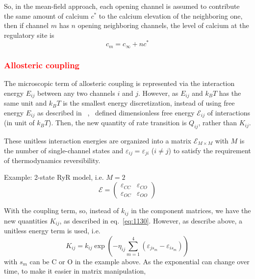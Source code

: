 So, in the mean-field approach, each opening channel is assumed to contribute
the same amount of calcium $c^*$ to the calcium elevation of the neighboring
one, then if channel $m$ has $n$ opening neighboring channels, the level of calcium at the regulatory
site is
\begin{equation}
  \label{eq:1154}
  c_m = c_\infty + nc^*
\end{equation}

\subsubsection{\textcolor{red}{\bf Allosteric coupling}}

The microscopic term of allosteric coupling is represented via the interaction
energy $E_{ij}$ between any two channels $i$ and $j$. However, as $E_{ij}$ and $k_BT$ has the same unit
and $k_BT$ is the smallest energy discretization, instead of using free energy $E_{ij}$ as
described in ~\citep{stern1999lcm},~\citep{groff2008} defined
dimensionless free energy $\mathcal{E}_{ij}$ of interactions (in unit
of $k_BT$). Then, the new quantity of rate transition is $Q_{ij}$,
rather than $K_{ij}$.

These unitless interaction energies are organized into a matrix
$\mathcal{E}_{M\times M}$ with $M$ is the number of single-channel
states and $\varepsilon_{ij}=\varepsilon_{ji}$ ($i\ne j$) to satisfy
the requirement of thermodynamics reversibility.

Example: 2-state RyR model, i.e. $M=2$
\begin{equation}
  \label{eq:1135}
  \mathcal{E}=\left(
    \begin{array}{ll}
      \varepsilon_{CC} & \varepsilon_{CO}\\
      \varepsilon_{OC} & \varepsilon_{OO}
    \end{array}
\right)
\end{equation}

With the coupling term, so, instead of $k_{ij}$ in the component matrices, we
have the new quantities $K_{ij}$, as described in eq.~\eqref{eq:1130}. However,
as describe above, a unitless energy term is used, i.e.
\begin{equation}
  \label{eq:1139}
  K_{ij} = k_{ij} \exp\left(-\eta_{ij}\sum^4_{m=1}(\varepsilon_{js_m}-\varepsilon_{is_m})\right)
\end{equation}
with $s_m$ can be C or O in the example above. As the exponential can change
over time, to make it easier in matrix manipulation,

